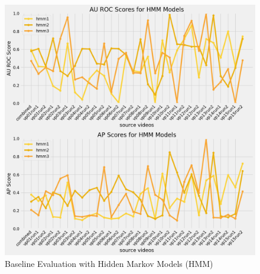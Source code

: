 \begin{figure}[h]
    \centering
    \includegraphics[width=\textwidth]{figures/05_baseline.png}
    \caption{Baseline Evaluation with Hidden Markov Models (HMM)}
    \label{fig:HMM_results}
\end{figure}


\clearpage
